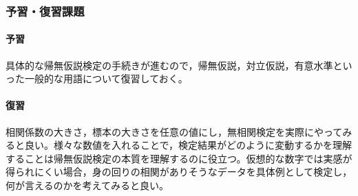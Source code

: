 \subsubsection{予習・復習課題}
\paragraph{予習}
具体的な帰無仮説検定の手続きが進むので，帰無仮説，対立仮説，有意水準といった一般的な用語について復習しておく。
\paragraph{復習}
相関係数の大きさ，標本の大きさを任意の値にし，無相関検定を実際にやってみると良い。様々な数値を入れることで，検定結果がどのように変動するかを理解することは帰無仮説検定の本質を理解するのに役立つ。仮想的な数字では実感が得られにくい場合，身の回りの相関がありそうなデータを具体例として検定し，何が言えるのかを考えてみると良い。